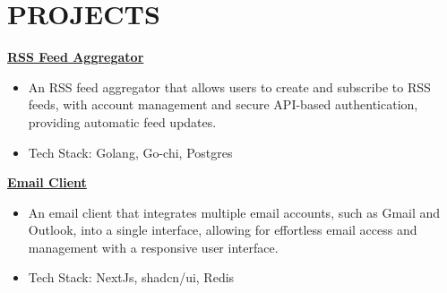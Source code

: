 \documentclass[]{resume}
\begin{document}
\section{PROJECTS}
\href{https://github.com/saswatax/rss-aggregator}{\textbf{RSS Feed Aggregator} \space\faExternalLink*}
\begin{itemize}
  \item An RSS feed aggregator that allows users to create and subscribe to RSS feeds, with account management and secure API-based authentication, providing automatic feed updates.
  \item Tech Stack: Golang, Go-chi, Postgres
\end{itemize}
\href{https://github.com/saswatax/email-client}{\textbf{Email Client} \space\faExternalLink*}
\begin{itemize}
  \item An email client that integrates multiple email accounts, such as Gmail and Outlook, into a single interface, allowing for effortless email access and management with a responsive user interface.
  \item Tech Stack: NextJs, shadcn/ui, Redis
\end{itemize}
\end{document}
